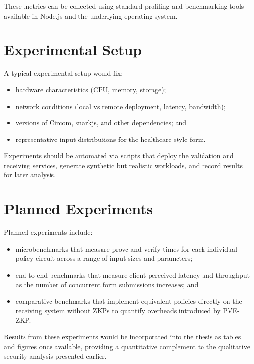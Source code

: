 These metrics can be collected using standard profiling and benchmarking tools
available in Node.js and the underlying operating system.

\section{Experimental Setup}

A typical experimental setup would fix:

\begin{itemize}[leftmargin=*]
  \item hardware characteristics (CPU, memory, storage);
  \item network conditions (local vs remote deployment, latency, bandwidth);
  \item versions of Circom, snarkjs, and other dependencies; and
  \item representative input distributions for the healthcare-style form.
\end{itemize}

Experiments should be automated via scripts that deploy the validation and
receiving services, generate synthetic but realistic workloads, and record
results for later analysis.

\section{Planned Experiments}

Planned experiments include:

\begin{itemize}[leftmargin=*]
  \item microbenchmarks that measure prove and verify times for each individual
    policy circuit across a range of input sizes and parameters;
  \item end-to-end benchmarks that measure client-perceived latency and
    throughput as the number of concurrent form submissions increases; and
  \item comparative benchmarks that implement equivalent policies directly on
    the receiving system without ZKPs to quantify overheads introduced by
    PVE-ZKP.
\end{itemize}

Results from these experiments would be incorporated into the thesis as tables
and figures once available, providing a quantitative complement to the
qualitative security analysis presented earlier.
